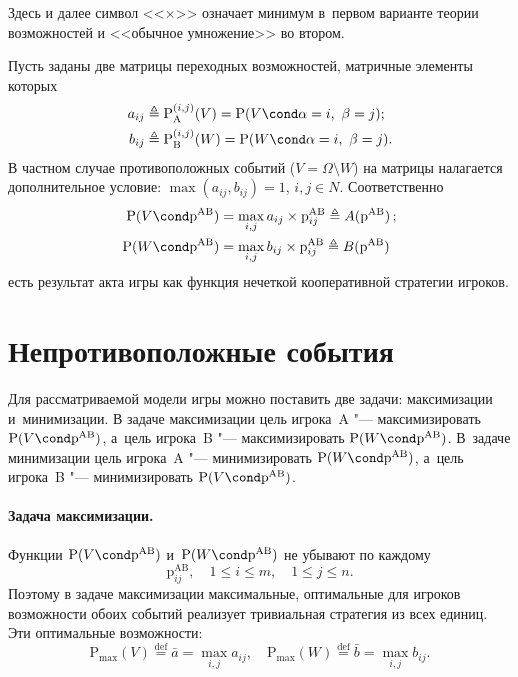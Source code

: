 \documentclass[twoside]{article}
\begin{document}
Здесь и далее символ <<$\times$>> означает минимум в~первом варианте
теории возможностей и <<обычное умножение>> во втором.

Пусть заданы две матрицы переходных возможностей, матричные элементы которых
    \[
    \begin{aligned}
a_{ij}&\triangleq\mathrm{P}_\mathrm{A}^{(i,j)}(V)=\mathrm{P}(V\cond\alpha=i,\
\beta=j);
    \\
b_{ij}&\triangleq\mathrm{P}_\mathrm{B}^{(i,j)}(W)=\mathrm{P}(W\cond\alpha=i,\
\beta=j).
    \end{aligned}
        \]
В частном случае противоположных событий ($V=\Omega\setminus W$) на
матрицы налагается дополнительное условие:
$\max(a_{ij},b_{ij})=1$,\; $i,j\in N$. Соответственно
    \begin{align}
\mathrm{P}(V\cond\mathrm{p}^\mathrm{AB})&=\max_{i,j}a_{ij}\times\mathrm{p}^\mathrm{AB}_{ij}\triangleq
A(\mathrm{p}^\mathrm{AB})\,;\label{PV}
    \\
\mathrm{P}(W\cond\mathrm{p}^\mathrm{AB})&=\max_{i,j}b_{ij}\times\mathrm{p}^\mathrm{AB}_{ij}\triangleq
B(\mathrm{p}^\mathrm{AB})\label{PW}
    \end{align}
есть результат акта игры как функция нечеткой кооперативной стратегии игроков.

\section{Непротивоположные события}
Для рассматриваемой модели игры можно пос\-та\-вить две задачи: максимизации и~минимизации. В
задаче максимизации цель игрока~A "--- максимизировать $\mathrm{P}(V\cond\mathrm{p}^\mathrm{AB})$,
а~цель игрока~B "--- максимизировать $\mathrm{P}(W\cond\mathrm{p}^\mathrm{AB})$. В~задаче
минимизации цель игрока~A "--- минимизировать $\mathrm{P}(W\cond\mathrm{p}^\mathrm{AB})$, а~цель
игрока~B "--- минимизировать $\mathrm{P}(V\cond\mathrm{p}^\mathrm{AB})$.
\paragraph{Задача максимизации.}
Функции $\mathrm{P}(V\cond\mathrm{p}^\mathrm{AB})$ и~$\mathrm{P}(W\cond\mathrm{p}^\mathrm{AB})$ не
убывают по каждому
    \[
\mathrm{p}^\mathrm{AB}_{ij},\quad 1\le i\le m,\quad 1\le j\le n.
    \]
Поэтому в задаче максимизации максимальные, оптимальные для игроков возможности обоих событий
реализует тривиальная стратегия из всех единиц. Эти оптимальные возможности:
    \[
\mathrm{P}_{\max}(V)\stackrel{\mathrm{def}}{=}\bar
a=\max_{i,j}a_{ij}, \quad
\mathrm{P}_{\max}(W)\stackrel{\mathrm{def}}{=}\bar
b=\max_{i,j}b_{ij}.
    \]
\end{document}
